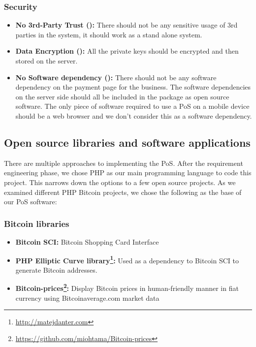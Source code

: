 \subsubsection{Security} 
\begin{itemize}

\item \textbf{No 3rd-Party Trust (\full): } There should not be any sensitive usage of 3rd parties in the system, it should work as a stand alone system.

\item \textbf{Data Encryption (\full): } All the private keys should be encrypted and then stored on the server. 

\item \textbf{No Software dependency (\prt): } There should not be any software dependency on the payment page for the business. The software dependencies on the server side should all be included in the package as open source software. The only piece of software required to use a PoS on a mobile device should be a web browser and we don't consider this as a software dependency.

\end{itemize}



\subsection{Open source libraries and software applications}
There are multiple approaches to implementing the PoS. After the requirement engineering phase, we chose PHP as our main programming language to code this project. This narrows down the options to a few open source projects.
As we examined different PHP Bitcoin projects, we chose the following as the base of our PoS software:

\subsubsection{Bitcoin libraries}
\begin{itemize}

\item \textbf{Bitcoin SCI: }Bitcoin Shopping Card Interface
\item \textbf{PHP Elliptic Curve library\footnote{\url{http://matejdanter.com}}: } Used as a dependency to Bitcoin SCI to generate Bitcoin addresses.
\item \textbf{Bitcoin-prices\footnote{\url{https://github.com/miohtama/Bitcoin-prices}}: } Display Bitcoin prices in human-friendly manner in fiat currency using Bitcoinaverage.com market data

\end{itemize}

